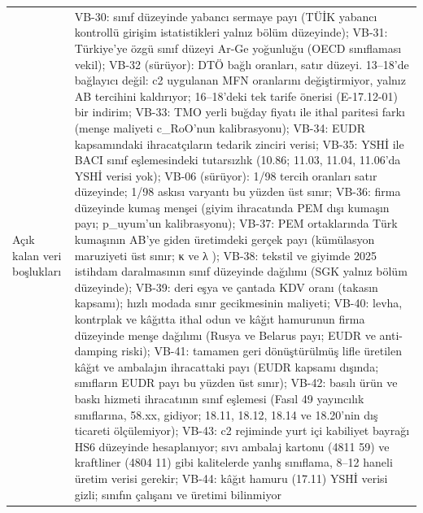 \begin{longtable}[]{@{}
  >{\raggedright\arraybackslash}p{}
  >{\raggedright\arraybackslash}p{}@{}}
Açık kalan veri boşlukları & VB-30: sınıf düzeyinde yabancı sermaye payı (TÜİK yabancı kontrollü girişim istatistikleri yalnız bölüm düzeyinde); VB-31: Türkiye'ye özgü sınıf düzeyi Ar-Ge yoğunluğu (OECD sınıflaması vekil); VB-32 (sürüyor): DTÖ bağlı oranları, satır düzeyi. 13--18'de bağlayıcı değil: c2 uygulanan MFN oranlarını değiştirmiyor, yalnız AB tercihini kaldırıyor; 16--18'deki tek tarife önerisi (E-17.12-01) bir indirim; VB-33: TMO yerli buğday fiyatı ile ithal paritesi farkı (menşe maliyeti c\_RoO'nun kalibrasyonu); VB-34: EUDR kapsamındaki ihracatçıların tedarik zinciri verisi; VB-35: YSHİ ile BACI sınıf eşlemesindeki tutarsızlık (10.86; 11.03, 11.04, 11.06'da YSHİ verisi yok); VB-06 (sürüyor): 1/98 tercih oranları satır düzeyinde; 1/98 askısı varyantı bu yüzden üst sınır; VB-36: firma düzeyinde kumaş menşei (giyim ihracatında PEM dışı kumaşın payı; p\_uyum'un kalibrasyonu); VB-37: PEM ortaklarında Türk kumaşının AB'ye giden üretimdeki gerçek payı (kümülasyon maruziyeti üst sınır; κ ve λ \etiketH{}); VB-38: tekstil ve giyimde 2025 istihdam daralmasının sınıf düzeyinde dağılımı (SGK yalnız bölüm düzeyinde); VB-39: deri eşya ve çantada KDV oranı (takasın kapsamı); hızlı modada sınır gecikmesinin maliyeti; VB-40: levha, kontrplak ve kâğıtta ithal odun ve kâğıt hamurunun firma düzeyinde menşe dağılımı (Rusya ve Belarus payı; EUDR ve anti-damping riski); VB-41: tamamen geri dönüştürülmüş lifle üretilen kâğıt ve ambalajın ihracattaki payı (EUDR kapsamı dışında; sınıfların EUDR payı bu yüzden üst sınır); VB-42: basılı ürün ve baskı hizmeti ihracatının sınıf eşlemesi (Fasıl 49 yayıncılık sınıflarına, 58.xx, gidiyor; 18.11, 18.12, 18.14 ve 18.20'nin dış ticareti ölçülemiyor); VB-43: c2 rejiminde yurt içi kabiliyet bayrağı HS6 düzeyinde hesaplanıyor; sıvı ambalaj kartonu (4811 59) ve kraftliner (4804 11) gibi kalitelerde yanlış sınıflama, 8--12 haneli üretim verisi gerekir; VB-44: kâğıt hamuru (17.11) YSHİ verisi gizli; sınıfın çalışanı ve üretimi bilinmiyor \\

\end{longtable}
